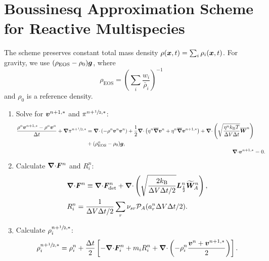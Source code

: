 \documentclass[
10pt
showpacs, showkeys,
amsmath,amssymb,
aps,
pre,
floatfix,
]{revtex4-1}
\newcommand{\divg}{{\V\nabla\cdot}}                       %
\begin{document}
\section*{Boussinesq Approximation Scheme for Reactive Multispecies}

\noindent The scheme preserves constant total mass density $\rho(\boldsymbol{x},t)=\sum_i \rho_i(\boldsymbol{x},t)$.
For gravity, we use $(\rho_\mathrm{EOS} - \rho_0)\boldsymbol{g}$, where
\begin{equation}
\rho_\mathrm{EOS} = \left(\sum_i \frac{w_i}{\bar{\rho}_i}\right)^{-1}
\end{equation}
and $\rho_0$ is a reference density.

\begin{enumerate}

\item Solve for $\boldsymbol{v}^{n+1,*}$ and $\pi^{n+\sfrac{1}{2},*}$:
\begin{align}
\label{boussinesq_stokes_v_1st}
\begin{split}
\frac{\rho^n\V{v}^{n+1,*}-\rho^n\V{v}^n}{\D{t}} + \grad\pi^{n+\myhalf,*}
& = \divg\left(-\rho^n\V{v}^n\V{v}^n\right) + 
\frac{1}{2}\divg\left( \eta^n \overline{\grad}\V{v}^n + \eta^n \overline{\grad}\V{v}^{n+1,*} \right)
+ \divg\left( \sqrt{\frac{\eta^n k_\mathrm{B}T}{\D{V}\D{t}} } \overline{\V{W}}^n \right)
\\
& + (\rho^n_\mathrm{EOS}-\rho_0)\V{g},
\end{split}
\\
\label{boussinesq_stokes_p_1st}
\divg\V{v}^{n+1,*} & = 0.
\end{align}

\item Calculate $\divg\V{F}^n$ and $R^n_i$:
\begin{align}
\label{boussinesq_fluxdiv_2nd}
& \divg\V{F}^n \equiv \divg\V{F}_\mathrm{det}^n + \divg\left( \sqrt{ \frac{2k_\mathrm{B}}{\D{V}\D{t}/2} } \V{L}^n_{\frac12} \widetilde{\V{W}}^n_A \right), \\
\label{boussinesq_chemrate_2nd}
& R^n_i = \frac{1}{\D{V}\D{t}/2}\sum_r \nu_{sr}\mathcal{P}_A(a^n_r\D{V}\D{t}/2).
\end{align}

\item Calculate $\rho^{n+\sfrac{1}{2},*}_i$:
\begin{equation}
\rho^{n+\myhalf,*}_i = \rho^n_i + \frac{\D{t}}{2} \left[ -\divg\V{F}^n_i + m_i R^n_i + \divg\left( -\rho^n_i \frac{\V{v}^n+\V{v}^{n+1,*}}{2} \right) \right].
\end{equation}


\end{enumerate}
\end{document}
